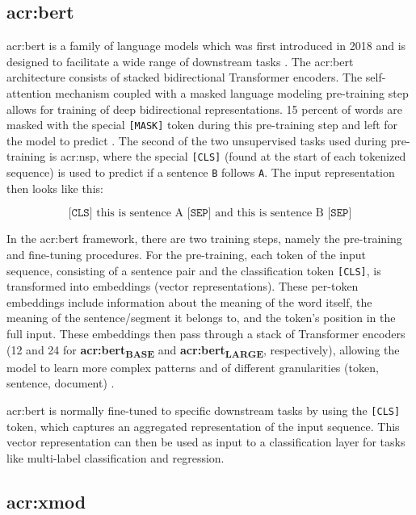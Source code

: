 \subsection[BERT]{\acrshort{acr:bert}}

\gls{acr:bert} is a family of language models which was first introduced in 2018 and is designed to facilitate a wide range of downstream tasks \citep[5]{devlinBERTPretrainingDeep2019}. The \acrshort{acr:bert} architecture consists of stacked bidirectional Transformer encoders. The self-attention mechanism coupled with a masked language modeling pre-training step allows for training of deep bidirectional representations. 15 percent of words are masked with the special \texttt{[MASK]} token during this pre-training step and left for the model to predict \citep[4]{devlinBERTPretrainingDeep2019}. The second of the two unsupervised tasks used during pre-training is \gls{acr:nsp}, where the special \texttt{[CLS]} (found at the start of each tokenized sequence) is used to predict if a sentence \texttt{B} follows \texttt{A}. The input representation then looks like this:

$$
    \texttt{[CLS]} \text{ this is sentence A } \texttt{[SEP]} \text{ and this is sentence B } \texttt{[SEP]}
$$

In the \acrshort{acr:bert} framework, there are two training steps, namely the pre-training and fine-tuning procedures. For the pre-training, each token of the input sequence, consisting of a sentence pair and the classification token \texttt{[CLS]}, is transformed into embeddings (vector representations). These per-token embeddings include information about the meaning of the word itself, the meaning of the sentence/segment it belongs to, and the token's position in the full input. These embeddings then pass through a stack of Transformer encoders (12 and 24 for \textbf{\acrshort{acr:bert}\textsubscript{BASE}} and \textbf{\acrshort{acr:bert}\textsubscript{LARGE}}, respectively), allowing the model to learn more complex patterns and of different granularities (token, sentence, document) \citep[5]{devlinBERTPretrainingDeep2019}.

\acrshort{acr:bert} is normally fine-tuned to specific downstream tasks by using the \texttt{[CLS]} token, which captures an aggregated representation of the input sequence. This vector representation can then be used as input to a classification layer for tasks like multi-label classification and regression.

\subsection[X-Mod]{\acrshort{acr:xmod}}

